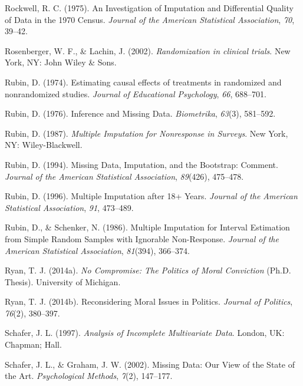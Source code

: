 \documentclass[12pt,econ]{sources/authesis}
\begin{document}
\leavevmode\hypertarget{ref-rockwell_1975_investigation}{}%
Rockwell, R. C. (1975). An Investigation of Imputation and Differential Quality of Data in the 1970 Census. \emph{Journal of the American Statistical Association}, \emph{70}, 39--42.

\leavevmode\hypertarget{ref-rosenberger_2002_randomization}{}%
Rosenberger, W. F., \& Lachin, J. (2002). \emph{Randomization in clinical trials}. New York, NY: John Wiley \& Sons.

\leavevmode\hypertarget{ref-rubin_1974_estimating}{}%
Rubin, D. (1974). Estimating causal effects of treatments in randomized and nonrandomized studies. \emph{Journal of Educational Psychology}, \emph{66}, 688--701.

\leavevmode\hypertarget{ref-rubin_1976_inference}{}%
Rubin, D. (1976). Inference and Missing Data. \emph{Biometrika}, \emph{63}(3), 581--592.

\leavevmode\hypertarget{ref-rubin_1987_multiple}{}%
Rubin, D. (1987). \emph{Multiple Imputation for Nonresponse in Surveys}. New York, NY: Wiley-Blackwell.

\leavevmode\hypertarget{ref-rubin_1994_missing}{}%
Rubin, D. (1994). Missing Data, Imputation, and the Bootstrap: Comment. \emph{Journal of the American Statistical Association}, \emph{89}(426), 475--478.

\leavevmode\hypertarget{ref-rubin_1996_multiple}{}%
Rubin, D. (1996). Multiple Imputation after 18+ Years. \emph{Journal of the American Statistical Association}, \emph{91}, 473--489.

\leavevmode\hypertarget{ref-rubin_1986_multiple}{}%
Rubin, D., \& Schenker, N. (1986). Multiple Imputation for Interval Estimation from Simple Random Samples with Ignorable Non-Response. \emph{Journal of the American Statistical Association}, \emph{81}(394), 366--374.

\leavevmode\hypertarget{ref-ryan_no_2014}{}%
Ryan, T. J. (2014a). \emph{No Compromise: The Politics of Moral Conviction} (Ph.D. Thesis). University of Michigan.

\leavevmode\hypertarget{ref-ryan_reconsidering_2014}{}%
Ryan, T. J. (2014b). Reconsidering Moral Issues in Politics. \emph{Journal of Politics}, \emph{76}(2), 380--397.

\leavevmode\hypertarget{ref-schafer_1997_analysis}{}%
Schafer, J. L. (1997). \emph{Analysis of Incomplete Multivariate Data}. London, UK: Chapman; Hall.

\leavevmode\hypertarget{ref-schafer_2002_missing}{}%
Schafer, J. L., \& Graham, J. W. (2002). Missing Data: Our View of the State of the Art. \emph{Psychological Methods}, \emph{7}(2), 147--177.
\end{document}
